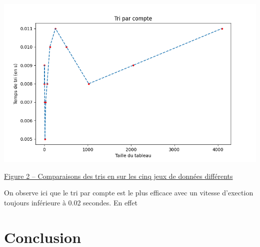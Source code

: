 \documentclass[11pt,a4paper]{article}
\begin{document}
    \includegraphics[scale = 0.7]{../Courbes/Valeurs_triées_inversement_avec_répétitions/Tri par compte.png}

    \underline {Figure 2 – Comparaisons des tris en sur les cinq jeux de données différents}
\newpage

On observe ici que le tri par compte est le plus efficace avec un vitesse d'exection toujours inférieure à 0.02 secondes.
En effet

\section{Conclusion}
\end{document}
